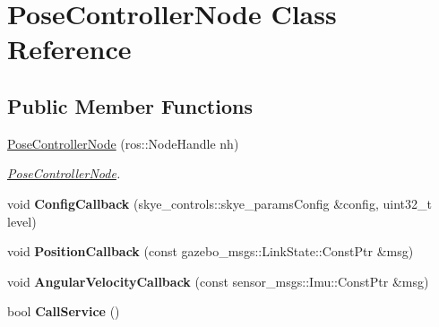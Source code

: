 \hypertarget{class_pose_controller_node}{\section{Pose\-Controller\-Node Class Reference}
\label{class_pose_controller_node}
}
\subsection*{Public Member Functions}
\begin{DoxyCompactItemize}
\item 
\hyperlink{class_pose_controller_node_a17466a8314ad354402401ba27157594c}{Pose\-Controller\-Node} (ros\-::\-Node\-Handle nh)
\begin{DoxyCompactList}\small\item\em \hyperlink{class_pose_controller_node}{Pose\-Controller\-Node}. \end{DoxyCompactList}\item 
\hypertarget{class_pose_controller_node_a819aeca3638e5b53eefc6f9891a8af03}{void {\bfseries Config\-Callback} (skye\-\_\-controls\-::skye\-\_\-params\-Config \&config, uint32\-\_\-t level)}\label{class_pose_controller_node_a819aeca3638e5b53eefc6f9891a8af03}

\item 
\hypertarget{class_pose_controller_node_ac4582290cf6ff6b5cd9564fd386c3b39}{void {\bfseries Position\-Callback} (const gazebo\-\_\-msgs\-::\-Link\-State\-::\-Const\-Ptr \&msg)}\label{class_pose_controller_node_ac4582290cf6ff6b5cd9564fd386c3b39}

\item 
\hypertarget{class_pose_controller_node_a1804624b5c2f57b08fcd1c50b8118cd7}{void {\bfseries Angular\-Velocity\-Callback} (const sensor\-\_\-msgs\-::\-Imu\-::\-Const\-Ptr \&msg)}\label{class_pose_controller_node_a1804624b5c2f57b08fcd1c50b8118cd7}

\item 
\hypertarget{class_pose_controller_node_a0b12265a62dad33caa6063f5cb582c80}{bool {\bfseries Call\-Service} ()}\label{class_pose_controller_node_a0b12265a62dad33caa6063f5cb582c80}

\end{DoxyCompactItemize}


